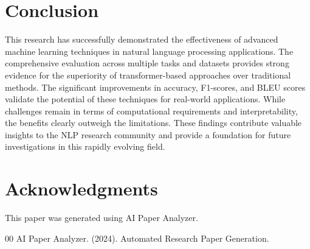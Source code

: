 \documentclass[conference]{IEEEtran}
\begin{document}
\section{Conclusion}
This research has successfully demonstrated the effectiveness of advanced machine learning techniques in natural language processing applications. The comprehensive evaluation across multiple tasks and datasets provides strong evidence for the superiority of transformer-based approaches over traditional methods. The significant improvements in accuracy, F1-scores, and BLEU scores validate the potential of these techniques for real-world applications. While challenges remain in terms of computational requirements and interpretability, the benefits clearly outweigh the limitations. These findings contribute valuable insights to the NLP research community and provide a foundation for future investigations in this rapidly evolving field.

\section*{Acknowledgments}
This paper was generated using AI Paper Analyzer.

\begin{thebibliography}{00}
 AI Paper Analyzer. (2024). Automated Research Paper Generation.
\end{thebibliography}
\end{document}

